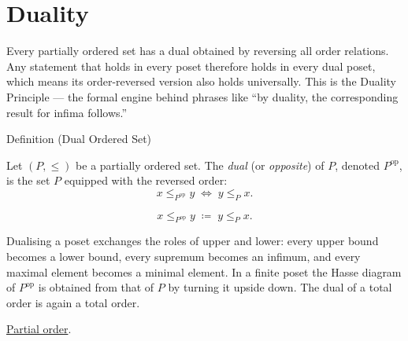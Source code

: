 
\section{Duality}
\label{sec:duality}

\begin{remark*}
Every partially ordered set has a dual obtained by reversing all order
relations.  Any statement that holds in every poset therefore holds in
every dual poset, which means its order-reversed version also holds
universally.  This is the Duality Principle --- the formal engine behind
phrases like ``by duality, the corresponding result for infima follows.''
\end{remark*}


\begin{definitionbox}{Definition (Dual Ordered Set)}
\begin{definition}
\label{def:dual-ordered-set}
Let $(P, \leq)$ be a partially ordered set.  The \emph{dual} (or
\emph{opposite}) of $P$, denoted $P^{\mathrm{op}}$, is the set $P$
equipped with the reversed order:
\[
x \leq_{P^{\mathrm{op}}} y \;\Longleftrightarrow\; y \leq_P x.
\]
\end{definition}
\end{definitionbox}

\begin{remark*}
\[
x \leq_{P^{\mathrm{op}}} y
\;\coloneqq\;
y \leq_P x.
\]
\end{remark*}

\begin{remark*}[Interpretation]
Dualising a poset exchanges the roles of upper and lower: every upper bound
becomes a lower bound, every supremum becomes an infimum, and every maximal
element becomes a minimal element.  In a finite poset the Hasse diagram of
$P^{\mathrm{op}}$ is obtained from that of $P$ by turning it upside down.
The dual of a total order is again a total order.
\end{remark*}

\begin{dependencies}
\hyperref[def:lattice-order-partial-order]{Partial order}.
\end{dependencies}

